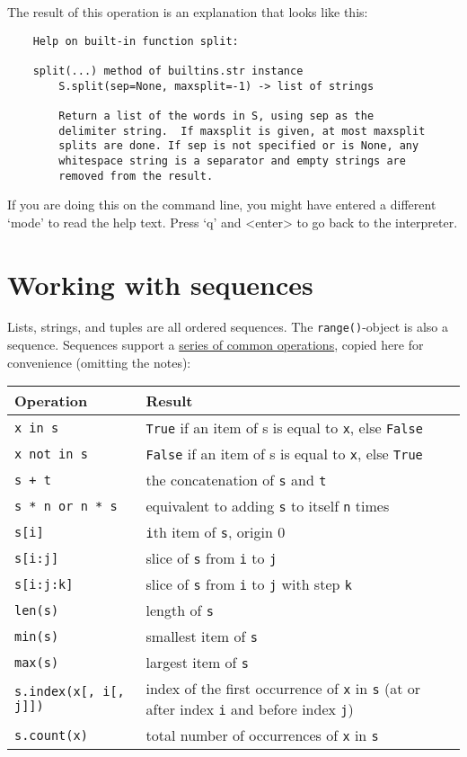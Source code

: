 \documentclass[12pt]{book}
\begin{document}
The result of this operation is an explanation that looks like this:
\begin{verbatim}
    Help on built-in function split:

    split(...) method of builtins.str instance
        S.split(sep=None, maxsplit=-1) -> list of strings

        Return a list of the words in S, using sep as the
        delimiter string.  If maxsplit is given, at most maxsplit
        splits are done. If sep is not specified or is None, any
        whitespace string is a separator and empty strings are
        removed from the result.
\end{verbatim}

If you are doing this on the command line, you might have entered a different
`mode' to read the help text. Press `q' and <enter> to go back to the interpreter.

\section{Working with sequences}
Lists, strings, and tuples are all ordered sequences. The \texttt{range()}-object is also a sequence. Sequences support a \href{https://docs.python.org/3/library/stdtypes.html\#common-sequence-operations}{series
of common operations}, copied here for convenience (omitting the notes):

\begin{table}[h]
\centering
\begin{tabular}{lp{10cm}}
\toprule
Operation & Result\\
\midrule
\texttt{x in s} &	\texttt{True} if an item of s is equal to \texttt{x}, else \texttt{False} \\
\texttt{x not in s} &	\texttt{False} if an item of s is equal to \texttt{x}, else \texttt{True}  \\
\texttt{s + t} &	the concatenation of \texttt{s} and \texttt{t}  \\
\texttt{s * n or n * s} & equivalent to adding \texttt{s} to itself \texttt{n} times  \\
\texttt{s[i]} & \texttt{i}th item of \texttt{s}, origin 0 	 \\
\texttt{s[i:j]} & slice of \texttt{s} from \texttt{i} to \texttt{j}  \\
\texttt{s[i:j:k]} &	slice of \texttt{s} from \texttt{i} to \texttt{j} with step \texttt{k}  \\
\texttt{len(s)} &	length of \texttt{s}  \\
\texttt{min(s)} &	smallest item of \texttt{s}  \\
\texttt{max(s)} &	largest item of \texttt{s}  \\
\texttt{s.index(x[, i[, j]])} &	index of the first occurrence of \texttt{x} in \texttt{s} (at or after index \texttt{i} and before index \texttt{j})  \\
\texttt{s.count(x)} &	total number of occurrences of \texttt{x} in \texttt{s}  \\
\bottomrule
\end{tabular}
\end{table}
\end{document}
